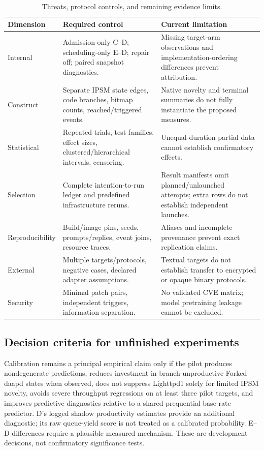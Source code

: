 \documentclass[final,5p,times,number]{elsarticle}
\begin{document}
\begin{table}[!tp]
\centering\small
\caption{Threats, protocol controls, and remaining evidence limits.}
\label{tab:threats}
\begin{tabularx}{\textwidth}{l Y Y}
\toprule
Dimension & Required control & Current limitation \\
\midrule
Internal & Admission-only C--D; scheduling-only E--D; repair off; paired snapshot diagnostics. & Missing target-arm observations and implementation-ordering differences prevent attribution. \\
Construct & Separate IPSM state edges, code branches, bitmap counts, reached/triggered events. & Native novelty and terminal summaries do not fully instantiate the proposed measures. \\
Statistical & Repeated trials, test families, effect sizes, clustered/hierarchical intervals, censoring. & Unequal-duration partial data cannot establish confirmatory effects. \\
Selection & Complete intention-to-run ledger and predefined infrastructure reruns. & Result manifests omit planned/unlaunched attempts; extra rows do not establish independent launches. \\
Reproducibility & Build/image pins, seeds, prompts/replies, event joins, resource traces. & Aliases and incomplete provenance prevent exact replication claims. \\
External & Multiple targets/protocols, negative cases, declared adapter assumptions. & Textual targets do not establish transfer to encrypted or opaque binary protocols. \\
Security & Minimal patch pairs, independent triggers, information separation. & No validated CVE matrix; model pretraining leakage cannot be excluded. \\
\bottomrule
\end{tabularx}
\end{table}

\subsection{Decision criteria for unfinished experiments}
Calibration remains a principal empirical claim only if the pilot produces nondegenerate predictions, reduces investment in branch-unproductive Forked-daapd states when observed, does not suppress Lighttpd1 solely for limited IPSM novelty, avoids severe throughput regressions on at least three pilot targets, and improves predictive diagnostics relative to a shared prequential base-rate predictor. D's logged shadow productivity estimates provide an additional diagnostic; its raw queue-yield score is not treated as a calibrated probability. E--D differences require a plausible measured mechanism. These are development decisions, not confirmatory significance tests.
\end{document}
